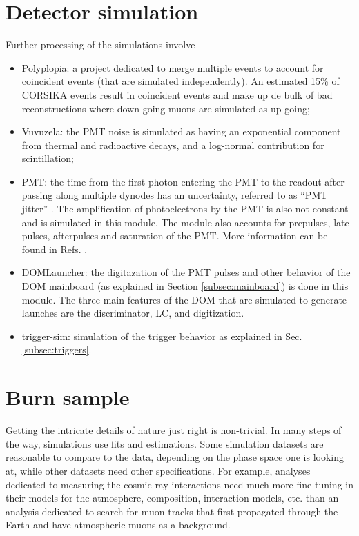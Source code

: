 \section{Detector simulation}
Further processing of the simulations involve
\begin{itemize}
\item Polyplopia: a project dedicated to merge multiple events to account for coincident events (that are simulated independently). An estimated 15\% of CORSIKA events result in coincident events and make up de bulk of bad reconstructions where down-going muons are simulated as up-going;
\item Vuvuzela: the PMT noise is simulated as having an exponential component from  thermal and radioactive decays, and a log-normal contribution for scintillation;
\item PMT: the time from the first photon entering the PMT to the readout after passing along multiple dynodes has an uncertainty, referred to as ``PMT jitter'' . The amplification of photoelectrons by the PMT is also not constant and is simulated in this module. The module also accounts for prepulses, late pulses, afterpulses and saturation of the PMT. More information can be found in Refs. \cite{Abbasi:2010vc,Ma:2009aw}.
\item DOMLauncher: the digitazation of the PMT pulses and other behavior of the DOM mainboard (as explained in Section \ref{subsec:mainboard}) is done in this module. The three main features of the DOM that are simulated to generate launches are the discriminator, LC, and digitization.
\item trigger-sim: simulation of the trigger behavior as explained in Sec. \ref{subsec:triggers}.
\end{itemize}


\section{Burn sample}
Getting the intricate details of nature just right is non-trivial. In many steps of the way, simulations use fits and estimations. Some simulation datasets are reasonable to compare to the data, depending on the phase space one is looking at, while other datasets need other specifications. For example, analyses dedicated to measuring the cosmic ray interactions need much more fine-tuning in their models for the atmosphere, composition, interaction models, etc. than an analysis dedicated to search for muon tracks that first propagated through the Earth and have atmospheric muons as a background.\\

